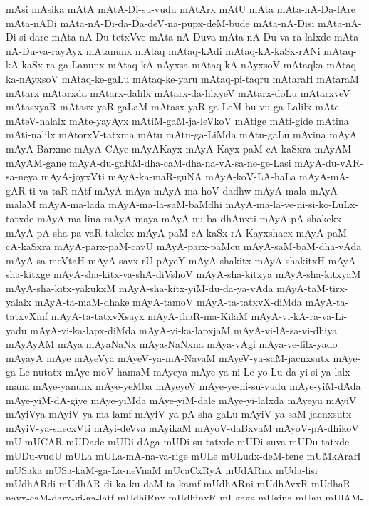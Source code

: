 {mAsi
mAsika
mAtA
mAtA-Di-su-vudu
mAtArx
mAtU
mAta
mAta-nA-Da-lAre
mAta-nADi
mAta-nA-Di-da-Da-deV-na-pupx-deM-bude
mAta-nA-Disi
mAta-nA-Di-si-dare
mAta-nA-Du-tetxVve
mAta-nA-Duva
mAta-nA-Du-va-ra-lalxde
mAta-nA-Du-va-rayAyx
mAtanunx
mAtaq
mAtaq-kAdi
mAtaq-kA-kaSx-rANi
mAtaq-kA-kaSx-ra-ga-Lanunx
mAtaq-kA-nAyxsa
mAtaq-kA-nAyxsoV
mAtaqka
mAtaq-ka-nAyxsoV
mAtaq-ke-gaLu
mAtaq-ke-yaru
mAtaq-pi-taqru
mAtaraH
mAtaraM
mAtarx
mAtarxda
mAtarx-dalilx
mAtarx-da-lilxyeV
mAtarx-doLu
mAtarxveV
mAtasxyaR
mAtasx-yaR-gaLaM
mAtasx-yaR-ga-LeM-bu-vu-ga-Lalilx
mAte
mAteV-nalalx
mAte-yayAyx
mAtiM-gaM-ja-leVkoV
mAtige
mAti-gide
mAtina
mAti-nalilx
mAtorxV-tatxma
mAtu
mAtu-ga-LiMda
mAtu-gaLu
mAvina
mAyA
mAyA-Barxme
mAyA-CAye
mAyAKayx
mAyA-Kayx-paM-cA-kaSxra
mAyAM
mAyAM-gane
mAyA-du-gaRM-dha-caM-dha-na-vA-sa-ne-ge-Lasi
mAyA-du-vAR-sa-neya
mAyA-joyxVti
mAyA-ka-maR-guNA
mAyA-koV-LA-haLa
mAyA-mA-gAR-ti-va-taR-nAtf
mAyA-mAya
mAyA-ma-hoV-dadhw
mAyA-mala
mAyA-malaM
mAyA-ma-lada
mAyA-ma-la-saM-baMdhi
mAyA-ma-la-ve-ni-si-ko-LuLx-tatxde
mAyA-ma-lina
mAyA-maya
mAyA-nu-ba-dhAnxti
mAyA-pA-shakekx
mAyA-pA-sha-pa-vaR-takekx
mAyA-paM-cA-kaSx-rA-Kayxshacx
mAyA-paM-cA-kaSxra
mAyA-parx-paM-cavU
mAyA-parx-paMcu
mAyA-saM-baM-dha-vAda
mAyA-sa-meVtaH
mAyA-savx-rU-pAyeY
mAyA-shakitx
mAyA-shakitxH
mAyA-sha-kitxge
mAyA-sha-kitx-va-shA-diVshoV
mAyA-sha-kitxya
mAyA-sha-kitxyaM
mAyA-sha-kitx-yakukxM
mAyA-sha-kitx-yiM-du-da-ya-vAda
mAyA-taM-tirx-yalalx
mAyA-ta-maM-dhake
mAyA-tamoV
mAyA-ta-tatxvX-diMda
mAyA-ta-tatxvXmf
mAyA-ta-tatxvXsayx
mAyA-thaR-ma-KilaM
mAyA-vi-kA-ra-va-Li-yadu
mAyA-vi-ka-lapx-diMda
mAyA-vi-ka-lapxjaM
mAyA-vi-lA-sa-vi-dhiya
mAyAyAM
mAya
mAyaNaNx
mAya-NaNxna
mAya-vAgi
mAya-ve-lilx-yado
mAyayA
mAye
mAyeVya
mAyeV-ya-mA-NavaM
mAyeV-ya-saM-jacnxsutx
mAye-ga-Le-nutatx
mAye-moV-hamaM
mAyeya
mAye-ya-ni-Le-yo-Lu-da-yi-si-ya-lalx-mana
mAye-yanunx
mAye-yeMba
mAyeyeV
mAye-ye-ni-su-vudu
mAye-yiM-dAda
mAye-yiM-dA-giye
mAye-yiMda
mAye-yiM-dale
mAye-yi-lalxda
mAyeyu
mAyiV
mAyiVya
mAyiV-ya-ma-lamf
mAyiV-ya-pA-sha-gaLu
mAyiV-ya-saM-jacnxsutx
mAyiV-ya-shecxVti
mAyi-deVva
mAyikaM
mAyoV-daBxvaM
mAyoV-pA-dhikoV
mU
mUCAR
mUDade
mUDi-dAga
mUDi-su-tatxde
mUDi-suva
mUDu-tatxde
mUDu-vudU
mULa
mULa-mA-na-va-rige
mULe
mULudx-deM-tene
mUMkAraH
mUSaka
mUSa-kaM-ga-La-neVnaM
mUcaCxRyA
mUdARnx
mUda-lisi
mUdhARdi
mUdhAR-di-ka-ku-daM-ta-kamf
mUdhARni
mUdhAvxR
mUdhaR-nayx-caM-darx-vi-ga-latf
mUdhiRnx
mUdhinxR
mUgage
mUgina
mUgu
mUlAM-ku-ra-va-na-ri-ya-ba-lalxre
mUlA-dhAra
mUlA-dhA-ra-cakarx
mUlA-dhA-ra-ca-karx-dalilx
mUlA-dhA-ra-dalilx
mUlA-dhA-ra-veMdu
mUlA-dhAreV
mUlAginx
mUlA-ginxya
mUlA-ginx-ya-ne-bibxsi
mUlA-haM-kA-ra-diMda
}
